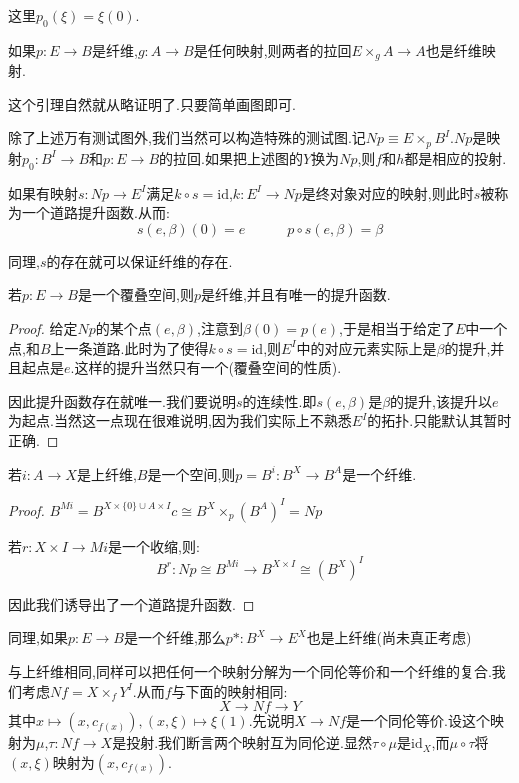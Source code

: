 这里$p_0(\xi)=\xi(0)$.
\begin{lemma}
    如果$p:E \to B$是纤维,$g:A \to B$是任何映射,则两者的拉回$E \times_g A \to A$也是纤维映射.
\end{lemma}
这个引理自然就从略证明了.只要简单画图即可.

除了上述万有测试图外,我们当然可以构造特殊的测试图.记$Np\equiv E \times_p B^I$.$Np$是映射$p_0:B^I \to B$和$p:E \to B$的拉回.如果把上述图的$Y$换为$Np$,则$f$和$h$都是相应的投射.

如果有映射$s:Np \to E^I$满足$k \circ s=\mathrm{id}$,$k:E^I \to Np$是终对象对应的映射,则此时$s$被称为一个道路提升函数.从而:
$$
s(e,\beta)(0)=e \quad \quad \quad p \circ s(e,\beta)=\beta
$$

同理,$s$的存在就可以保证纤维的存在.
\begin{lemma}
    若$p:E\to B$是一个覆叠空间,则$p$是纤维,并且有唯一的提升函数.
\end{lemma}
\begin{proof}
    给定$Np$的某个点$(e,\beta)$,注意到$\beta(0)=p(e)$,于是相当于给定了$E$中一个点,和$B$上一条道路.此时为了使得$k \circ s=\mathrm{id}$,则$E^I$中的对应元素实际上是$\beta$的提升,并且起点是$e$.这样的提升当然只有一个(覆叠空间的性质).

    因此提升函数存在就唯一.我们要说明$s$的连续性.即$s(e,\beta)$是$\beta$的提升,该提升以$e$为起点.当然这一点现在很难说明,因为我们实际上不熟悉$E^I$的拓扑.只能默认其暂时正确.
\end{proof}
\begin{proposition}
    若$i:A \to X$是上纤维,$B$是一个空间,则$p=B^i:B^X \to B^A$是一个纤维.
\end{proposition}
\begin{proof}
    $B^{Mi}=B^{X\times\{0\} \cup A \times I}c\cong B^X \times_p (B^A)^I=Np$

    若$r:X \times I \to Mi$是一个收缩,则:
    $$
    B^r:Np \cong B^{Mi} \to B^{X \times I}\cong (B^X)^I
    $$

    因此我们诱导出了一个道路提升函数.
\end{proof}
同理,如果$p:E \to B$是一个纤维,那么$p*:B^X \to E^X$也是上纤维(尚未真正考虑)

与上纤维相同,同样可以把任何一个映射分解为一个同伦等价和一个纤维的复合.我们考虑$Nf=X \times_f Y^I$.从而$f$与下面的映射相同:
$$
X \to Nf \to Y
$$
其中$x \mapsto (x,c_{f(x)}),(x,\xi) \mapsto \xi(1)$.先说明$X \to Nf$是一个同伦等价.设这个映射为$\mu$,$\tau:Nf \to X$是投射.我们断言两个映射互为同伦逆.显然$\tau \circ \mu$是$\mathrm{id}_X$,而$\mu \circ \tau$将$(x,\xi)$映射为$(x,c_{f(x)})$.

